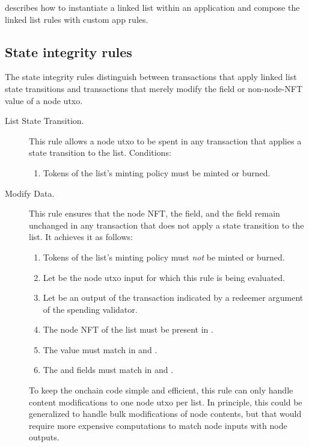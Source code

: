 \documentclass[../midgard.tex]{subfiles}
\begin{document}
 describes how to instantiate a linked list within an application and compose the linked list rules with custom app rules.

\subsection{State integrity rules}
\label{h:list-state-integrity-rules}

The state integrity rules distinguish between transactions that apply linked list state transitions and transactions that merely modify the  field or non-node-NFT value of a node utxo.

\begin{description}
    \item[List State Transition.]
    This rule allows a node utxo to be spent in any transaction that applies a state transition to the list.
    Conditions:
    \begin{enumerate}
        \item Tokens of the list's minting policy must be minted or burned.
    \end{enumerate}
    
    \item[Modify Data.]
    This rule ensures that the node NFT, the  field, and the  field remain unchanged in any transaction that does not apply a state transition to the list.
    It achieves it as follows:

    \begin{enumerate}
        \item Tokens of the list's minting policy must \emph{not} be minted or burned.
        \item Let  be the node utxo input for which this rule is being evaluated.
        \item Let  be an output of the transaction indicated by a redeemer argument of the spending validator.
        \item The node NFT of the list must be present in .
        \item The value must match in  and .
        \item The  and  fields must match in  and .
    \end{enumerate}
    
    To keep the onchain code simple and efficient, this rule can only handle content modifications to one node utxo per list.
    In principle, this could be generalized to handle bulk modifications of node contents, but that would require more expensive computations to match node inputs with node outputs.
\end{description}
\end{document}
